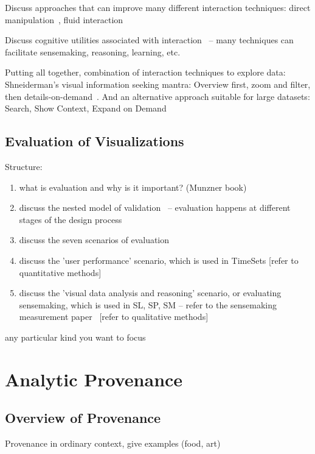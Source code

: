 Discuss approaches that can improve many different interaction techniques: direct manipulation~\cite{Shneiderman1982, Kwon2011}, fluid interaction~\cite{Elmqvist2011}

Discuss cognitive utilities associated with interaction~\cite{Sedig2013} -- many techniques can facilitate sensemaking, reasoning, learning, etc.

Putting all together, combination of interaction techniques to explore data: Shneiderman's visual information seeking mantra: Overview first, zoom and filter, then details-on-demand~\cite{Shneiderman1996}. And an alternative approach suitable for large datasets: Search, Show Context, Expand on Demand ~\cite{VanHam2009}

\subsection{Evaluation of Visualizations}
Structure:
\begin{enumerate}
	\item what is evaluation and why is it important? (Munzner book)
	\item discuss the nested model of validation~\cite{Munzner2009} -- evaluation happens at different stages of the design process
	\item discuss the seven scenarios of evaluation ~\cite{Lam2012}
	\item discuss the 'user performance' scenario, which is used in TimeSets [refer to quantitative methods]
	\item discuss the 'visual data analysis and reasoning' scenario, or evaluating sensemaking, which is used in SL, SP, SM -- refer to the sensemaking measurement paper ~\cite{Wilson2013}[refer to qualitative methods]
\end{enumerate}


any particular kind you want to focus 
\section{Analytic Provenance}
\subsection{Overview of Provenance}
Provenance in ordinary context, give examples (food, art)

